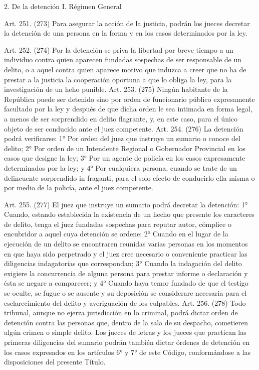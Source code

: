   2. De la detención
    I. Régimen General



    Art. 251. (273) Para asegurar la acción de la justicia, podrán los jueces decretar la detención de una persona en la forma y en los casos determinados por la ley.

    Art. 252. (274) Por la detención se priva la libertad por breve tiempo a un individuo contra quien aparecen fundadas sospechas de ser responsable de un delito, o a aquel contra quien aparece motivo que induzca a creer que no ha de prestar a la justicia la cooperación oportuna a que lo obliga la ley, para la investigación de un heho punible.
    Art. 253. (275) Ningún habitante de la República puede ser detenido sino por orden de funcionario público expresamente facultado por la ley y después de que dicha orden le sea intimada en forma legal, a menos de ser sorprendido en delito flagrante, y, en este caso, para el único objeto de ser conducido ante el juez competente.
    Art. 254. (276) La detención podrá verificarse:
    1° Por orden del juez que instruye un sumario o conoce del delito;
    2° Por orden de un Intendente Regional o Gobernador Provincial en los casos que designe la ley;
    3° Por un agente de policía en los casos expresamente determinados por la ley; y
    4° Por cualquiera persona, cuando se trate de un delincuente sorprendido in fraganti, para el solo efecto de conducirlo ella misma o por medio de la policía, ante el juez competente.

    Art. 255. (277) El juez que instruye un sumario podrá decretar la detención:
    1° Cuando, estando establecida la existencia de un hecho que presente los caracteres de delito, tenga el juez fundadas sospechas para reputar autor, cómplice o encubridor a aquel cuya detención se ordene;
    2° Cuando en el lugar de la ejecución de un delito se encontraren reunidas varias personas en los momentos en que haya sido perpetrado y el juez cree necesario o conveniente practicar las diligencias indagatorias que correspondan;
    3° Cuando la indagación del delito exigiere la concurrencia de alguna persona para prestar informe o declaración y ésta se negare a comparecer; y
    4° Cuando haya temor fundado de que el testigo se oculte, se fugue o se ausente y su deposición se considerare necesaria para el esclarecimiento del delito y averiguación de los culpables.
    Art. 256. (278) Todo tribunal, aunque no ejerza jurisdicción en lo criminal, podrá dictar orden de detención contra las personas que, dentro de la sala de su despacho, cometieren algún crimen o simple delito.
    Los jueces de letras y los jueces que practican las primeras diligencias del sumario podrán también dictar órdenes de detención en los casos expresados en los artículos 6° y 7° de este Código, conformándose a las disposiciones del presente Título.

